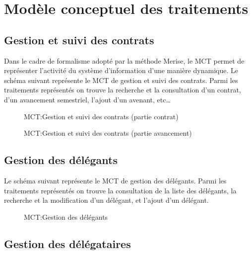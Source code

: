 	\section{Modèle conceptuel des traitements}
	\subsection{Gestion et suivi des contrats}

	Dans le cadre de formalisme adopté par la méthode Merise, le MCT permet de représenter l’activité du
	système d’information d’une manière dynamique.
	Le schéma suivant représente le MCT de gestion et suivi des contrats. Parmi les traitements représentés
	on trouve la recherche et la consultation d'un contrat, d'un avancement semestriel,
	l'ajout d'un avenant, etc\dots

	\begin{figure}[H]
		\begin{center}
			\caption{MCT:Gestion et suivi des contrats (partie contrat)}
		\end{center}
	\end{figure}

	\begin{figure}[H]
		\begin{center}
			\caption{MCT:Gestion et suivi des contrats (partie avancement)}
		\end{center}
	\end{figure}

	\subsection{Gestion des délégants}

	Le schéma suivant représente le MCT de gestion des délégants. Parmi les traitements représentés
	on trouve la consultation de la liste des délégants, la recherche et la modification d'un délégant,
	et l'ajout d'un délégant.
	\begin{figure}[H]
		\begin{center}
			\caption{MCT:Gestion des délégants}
		\end{center}
	\end{figure}

	\subsection{Gestion des délégataires}

